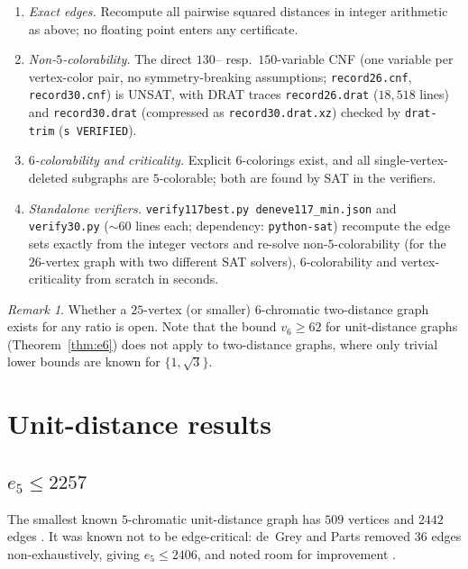 \documentclass[11pt]{article}
\theoremstyle{definition}
\theoremstyle{remark}
\newtheorem{remark}[theorem]{Remark}
\begin{document}
\begin{enumerate}
\item \emph{Exact edges.}  Recompute all pairwise squared distances in
integer arithmetic as above; no floating point enters any certificate.
\item \emph{Non-$5$-colorability.}  The direct $130$-- resp.\
$150$-variable CNF (one variable per vertex-color pair, no
symmetry-breaking assumptions; \texttt{record26.cnf},
\texttt{record30.cnf}) is UNSAT, with DRAT traces
\texttt{record26.drat} ($18{,}518$ lines) and \texttt{record30.drat}
(compressed as \texttt{record30.drat.xz}) checked by \texttt{drat-trim}
(\texttt{s VERIFIED}).
\item \emph{$6$-colorability and criticality.}  Explicit $6$-colorings
exist, and all single-vertex-deleted subgraphs are $5$-colorable; both
are found by SAT in the verifiers.
\item \emph{Standalone verifiers.}  \texttt{verify117best.py
deneve117\_min.json} and \texttt{verify30.py} ($\sim60$ lines each;
dependency: \texttt{python-sat}) recompute the edge sets exactly from the
integer vectors and re-solve non-$5$-colorability (for the $26$-vertex
graph with two different SAT solvers), $6$-colorability and
vertex-criticality from scratch in seconds.
\end{enumerate}

\begin{remark}
Whether a $25$-vertex (or smaller) $6$-chromatic two-distance graph
exists for any ratio is open.  Note that the bound $v_6\ge62$ for
unit-distance graphs (Theorem~\ref{thm:e6}) does not apply to two-distance
graphs, where only trivial lower bounds are known for $\{1,\sqrt3\}$.
\end{remark}

\section{Unit-distance results}\label{sec:ud}

\subsection{$e_5\le2257$}\label{sec:e5}

The smallest known $5$-chromatic unit-distance graph has $509$ vertices
and $2442$ edges \cite{Parts20b,deGreyParts22}.  It was known not to be
edge-critical: de~Grey and Parts removed $36$ edges non-exhaustively,
giving $e_5\le2406$, and noted room for improvement
\cite{deGreyParts22}.
\end{document}
